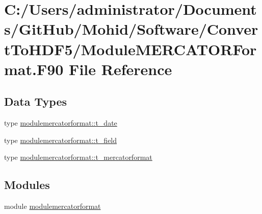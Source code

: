 \hypertarget{_module_m_e_r_c_a_t_o_r_format_8_f90}{}\section{C\+:/\+Users/administrator/\+Documents/\+Git\+Hub/\+Mohid/\+Software/\+Convert\+To\+H\+D\+F5/\+Module\+M\+E\+R\+C\+A\+T\+O\+R\+Format.F90 File Reference}
\label{_module_m_e_r_c_a_t_o_r_format_8_f90}
\subsection*{Data Types}
\begin{DoxyCompactItemize}
\item 
type \mbox{\hyperlink{structmodulemercatorformat_1_1t__date}{modulemercatorformat\+::t\+\_\+date}}
\item 
type \mbox{\hyperlink{structmodulemercatorformat_1_1t__field}{modulemercatorformat\+::t\+\_\+field}}
\item 
type \mbox{\hyperlink{structmodulemercatorformat_1_1t__mercatorformat}{modulemercatorformat\+::t\+\_\+mercatorformat}}
\end{DoxyCompactItemize}
\subsection*{Modules}
\begin{DoxyCompactItemize}
\item 
module \mbox{\hyperlink{namespacemodulemercatorformat}{modulemercatorformat}}
\end{DoxyCompactItemize}
